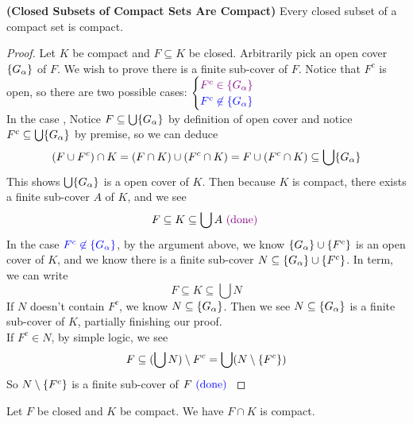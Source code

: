 \documentclass{report}
\begin{document}
\begin{theorem}
\label{2.8.5}
\textbf{(Closed Subsets of Compact Sets Are Compact)} Every closed subset of a compact set is compact.
\end{theorem}
\begin{proof}
Let $K$ be compact and $F\subseteq K$ be closed. Arbitrarily pick an open cover $\{ G_\alpha  \}$ of $F$. We wish to prove there is a finite sub-cover of $F$. Notice that $F^c$ is open, so there are two possible cases:  $\begin{cases}
  \textcolor{violet}{F^c\in \{ G_\alpha  \}}\\
  \textcolor{blue}{F^c\not\in \{ G_\alpha  \}}
\end{cases}$\\

In the case  , Notice  $F\subseteq \bigcup \{ G_{\alpha } \}$ by definition of open cover and notice $F^c\subseteq \bigcup \{ G_\alpha  \}$ by premise, so we can deduce
\begin{equation}
(F\cup F^c)\cap K=(F\cap K)\cup (F^c \cap K)=F \cup (F^c \cap K)\subseteq \bigcup \{ G_\alpha  \}
\end{equation}
This shows $\bigcup \{ G_\alpha  \}$ is a open cover of $K$. Then because  $K$ is compact, there exists a finite sub-cover $A$ of $K$, and we see
\begin{equation}
F\subseteq K \subseteq \bigcup A\textcolor{violet}{\text{ (done) }}
\end{equation}
In the case $\textcolor{blue}{F^c\not\in \{ G_\alpha  \}}$, by the argument above, we know $\{ G_\alpha  \} \cup \{ F^c \}$ is an open cover of $K$, and we know there is a finite sub-cover $N\subseteq\{ G_\alpha  \} \cup \{ F^c \}$. In term, we can write
\begin{equation}
F\subseteq K \subseteq \bigcup N
\end{equation}
If $N$ doesn't contain $F^c$, we know $N\subseteq \{ G_\alpha  \}$. Then we see $N\subseteq \{ G_\alpha  \}$ is a finite sub-cover of $K$, partially finishing our proof.\\

If $F^c \in N$, by simple logic, we see
\begin{equation}
F\subseteq (\bigcup N)\setminus F^c=\bigcup (N\setminus \{ F^c \}) 
\end{equation}
So $N\setminus \{ F^c \}$ is a finite sub-cover of $F\textcolor{blue}{\text{ (done) }}$
\end{proof}
\begin{corollary}
\label{2.8.6}
Let $F$ be closed and  $K$ be compact. We have $F\cap K$ is compact.
\end{corollary}
\end{document}
